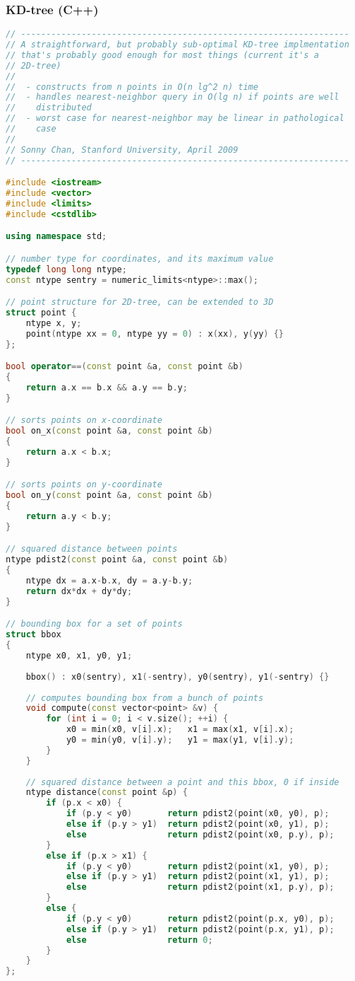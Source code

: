 \subsubsection{KD-tree (C++)}
\begin{lstlisting}[language=C++]
// -----------------------------------------------------------------
// A straightforward, but probably sub-optimal KD-tree implmentation
// that's probably good enough for most things (current it's a
// 2D-tree)
//
//  - constructs from n points in O(n lg^2 n) time
//  - handles nearest-neighbor query in O(lg n) if points are well
//    distributed
//  - worst case for nearest-neighbor may be linear in pathological
//    case
//
// Sonny Chan, Stanford University, April 2009
// -----------------------------------------------------------------

#include <iostream>
#include <vector>
#include <limits>
#include <cstdlib>

using namespace std;

// number type for coordinates, and its maximum value
typedef long long ntype;
const ntype sentry = numeric_limits<ntype>::max();

// point structure for 2D-tree, can be extended to 3D
struct point {
    ntype x, y;
    point(ntype xx = 0, ntype yy = 0) : x(xx), y(yy) {}
};

bool operator==(const point &a, const point &b)
{
    return a.x == b.x && a.y == b.y;
}

// sorts points on x-coordinate
bool on_x(const point &a, const point &b)
{
    return a.x < b.x;
}

// sorts points on y-coordinate
bool on_y(const point &a, const point &b)
{
    return a.y < b.y;
}

// squared distance between points
ntype pdist2(const point &a, const point &b)
{
    ntype dx = a.x-b.x, dy = a.y-b.y;
    return dx*dx + dy*dy;
}

// bounding box for a set of points
struct bbox
{
    ntype x0, x1, y0, y1;
    
    bbox() : x0(sentry), x1(-sentry), y0(sentry), y1(-sentry) {}
    
    // computes bounding box from a bunch of points
    void compute(const vector<point> &v) {
        for (int i = 0; i < v.size(); ++i) {
            x0 = min(x0, v[i].x);   x1 = max(x1, v[i].x);
            y0 = min(y0, v[i].y);   y1 = max(y1, v[i].y);
        }
    }
    
    // squared distance between a point and this bbox, 0 if inside
    ntype distance(const point &p) {
        if (p.x < x0) {
            if (p.y < y0)       return pdist2(point(x0, y0), p);
            else if (p.y > y1)  return pdist2(point(x0, y1), p);
            else                return pdist2(point(x0, p.y), p);
        }
        else if (p.x > x1) {
            if (p.y < y0)       return pdist2(point(x1, y0), p);
            else if (p.y > y1)  return pdist2(point(x1, y1), p);
            else                return pdist2(point(x1, p.y), p);
        }
        else {
            if (p.y < y0)       return pdist2(point(p.x, y0), p);
            else if (p.y > y1)  return pdist2(point(p.x, y1), p);
            else                return 0;
        }
    }
};


\end{lstlisting}
